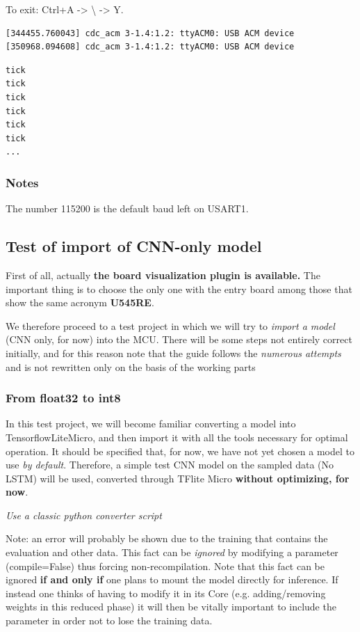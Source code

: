 To exit: Ctrl+A -> \textbackslash{} -> Y. 

\begin{lstlisting}[language=bash]
[344455.760043] cdc_acm 3-1.4:1.2: ttyACM0: USB ACM device
[350968.094608] cdc_acm 3-1.4:1.2: ttyACM0: USB ACM device
\end{lstlisting}


\begin{lstlisting}[language=bash]
tick
tick
tick
tick
tick
tick
...
\end{lstlisting}

\subsubsection{Notes}
The number 115200 is the default baud left on USART1.

\subsection{Test of import of CNN-only model}
First of all, actually \textbf{the board visualization plugin is available.} The important thing is to choose the only one with the entry board among those that show the same acronym \textbf{U545RE}.

We therefore proceed to a test project in which we will try to \textit{import a model} (CNN only, for now) into the MCU. There will be some steps not entirely correct initially, and for this reason note that the guide follows the \textit{numerous attempts} and is not rewritten only on the basis of the working parts

\subsubsection{From float32 to int8}
In this test project, we will become familiar converting a model into TensorflowLiteMicro, and then import it with all the tools necessary for optimal operation. It should be specified that, for now, we have not yet chosen a model to use \textit{by default}. Therefore, a simple test CNN model on the sampled data (No LSTM) will be used, converted through TFlite Micro \textbf{without optimizing, for now}.

\begin{center}
    \textit{Use a classic python converter script}
\end{center}


Note: an error will probably be shown due to the training that contains the evaluation and other data. This fact can be \textit{ignored} by modifying a parameter (compile=False) thus forcing non-recompilation. Note that this fact can be ignored \textbf{if and only if} one plans to mount the model directly for inference. If instead one thinks of having to modify it in its Core (e.g. adding/removing weights in this reduced phase) it will then be vitally important to include the parameter in order not to lose the training data.

